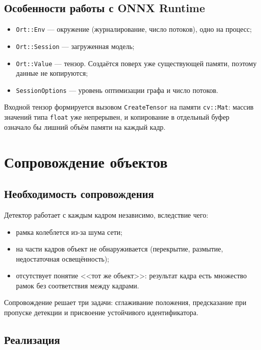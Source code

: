 \documentclass[11pt,a4paper]{article}
\theoremstyle{definition}
\theoremstyle{remark}
\begin{document}
\subsection{Особенности работы с ONNX Runtime}

\begin{itemize}
  \item \texttt{Ort::Env} --- окружение (журналирование, число потоков), одно
        на процесс;
  \item \texttt{Ort::Session} --- загруженная модель;
  \item \texttt{Ort::Value} --- тензор. Создаётся поверх уже существующей
        памяти, поэтому данные не копируются;
  \item \texttt{SessionOptions} --- уровень оптимизации графа и число потоков.
\end{itemize}

Входной тензор формируется вызовом \texttt{CreateTensor} на памяти
\texttt{cv::Mat}: массив значений типа \texttt{float} уже непрерывен, и
копирование в отдельный буфер означало бы лишний объём памяти на каждый кадр.

\section{Сопровождение объектов}
\label{sec:track}

\subsection{Необходимость сопровождения}

Детектор работает с каждым кадром независимо, вследствие чего:

\begin{itemize}
  \item рамка колеблется из-за шума сети;
  \item на части кадров объект не обнаруживается (перекрытие, размытие,
        недостаточная освещённость);
  \item отсутствует понятие <<тот же объект>>: результат кадра есть множество
        рамок без соответствия между кадрами.
\end{itemize}

Сопровождение решает три задачи: сглаживание положения, предсказание при
пропуске детекции и присвоение устойчивого идентификатора.

\subsection{Реализация}
\end{document}
